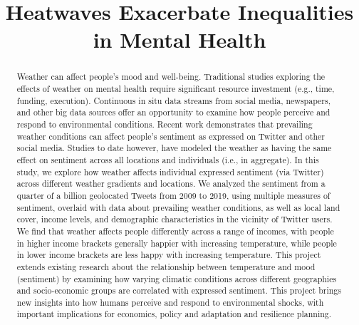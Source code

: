 \documentclass{article}
\begin{document}
\title{Heatwaves Exacerbate Inequalities in Mental Health}



\maketitle

\begin{abstract}
Weather can affect people’s mood and well-being. Traditional studies exploring the effects of weather on mental health require significant resource investment (e.g., time, funding, execution).  Continuous in situ data streams from social media, newspapers, and other big data sources offer an opportunity to examine how people perceive and respond to environmental conditions. Recent work demonstrates that prevailing weather conditions can affect people’s sentiment as expressed on Twitter and other social media.  Studies to date however, have modeled the weather as having the same effect on sentiment across all locations and individuals (i.e., in aggregate).  In this study, we explore how weather affects individual expressed sentiment (via Twitter) across different weather gradients and locations. We analyzed the sentiment from a quarter of a billion geolocated Tweets from 2009 to 2019, using multiple measures of sentiment, overlaid with data about prevailing weather conditions, as well as local land cover, income levels, and demographic characteristics in the vicinity of Twitter users.  We find that weather affects people differently across a range of incomes, with people in higher income brackets generally happier with increasing temperature, while people in lower income brackets are less happy with increasing temperature.  This project extends existing research about the relationship between temperature and mood (sentiment) by examining how varying climatic conditions across different geographies and socio-economic groups are correlated with expressed sentiment. This project brings new insights into how humans perceive and respond to environmental shocks, with important implications for economics, policy and adaptation and resilience planning.

\end{abstract}
\end{document}
